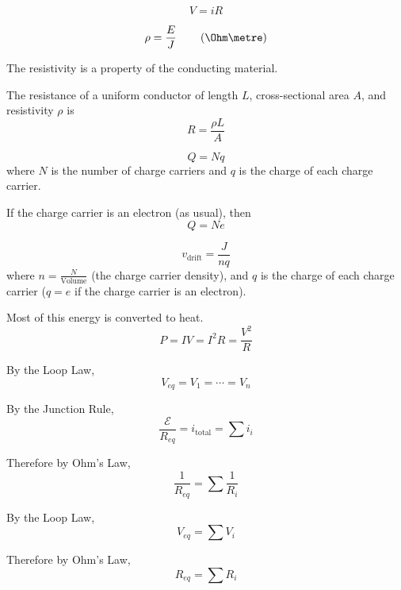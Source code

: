 \begin{namedlaw}
  \[
    V = iR
  \]
\end{namedlaw}

\begin{definition}[Resistivity]
  \[
    \rho = \frac{E}{J} \qquad \left( \Ohm \metre \right)
  \]

  The resistivity is a property of the conducting material.
\end{definition}

\begin{lemma}
  The resistance of a uniform conductor of length $L$, cross-sectional area $A$, and resistivity $\rho$ is
  \[
    R = \frac{\rho L}{A}
  \]
\end{lemma}

\begin{law}
  \[
    Q = Nq
  \]
  where $N$ is the number of charge carriers and $q$ is the charge of each charge carrier.

  If the charge carrier is an electron (as usual), then
  \[
    Q = Ne
  \]
\end{law}

\begin{definition}
  \[
    v_\text{drift} = \frac{J}{nq}
  \]
  where $n = \frac{N}{\text{Volume}}$ (the charge carrier density), and $q$ is the charge of each charge carrier ($q = e$ if the charge carrier is an electron).
\end{definition}

\begin{theorem}
  Most of this energy is converted to heat.
  \[
    P = IV = I^2 R = \frac{V^2}{R}
  \]
\end{theorem}

\begin{lemma}
  By the Loop Law,
  \[
    V_{eq} = V_1 = \cdots = V_n
  \]

  By the Junction Rule,
  \[
    \frac{\mathcal{E}}{R_{eq}} = i_{\text{total}} = \sum i_i
  \]

  Therefore by Ohm's Law,
  \[
    \frac{1}{R_{eq}} = \sum \frac{1}{R_i}
  \]
\end{lemma}

\begin{lemma}
  By the Loop Law,
  \[
    V_{eq} = \sum V_i
  \]

  Therefore by Ohm's Law,
  \[
    R_{eq} = \sum R_i
  \]
\end{lemma}

